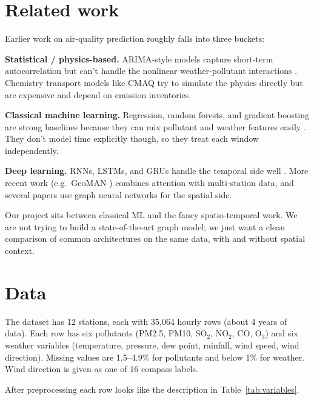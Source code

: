 \documentclass{article}
\begin{document}
\section{Related work}

Earlier work on air-quality prediction roughly falls into three
buckets:

\textbf{Statistical / physics-based.} ARIMA-style models capture short-term
autocorrelation but can't handle the nonlinear weather-pollutant
interactions \cite{Kumar2010arima}. Chemistry transport models like
CMAQ try to simulate the physics directly but are expensive and depend
on emission inventories.

\textbf{Classical machine learning.} Regression, random forests, and
gradient boosting are strong baselines because they can mix pollutant
and weather features easily \cite{Zheng2015kdd}. They don't model time
explicitly though, so they treat each window independently.

\textbf{Deep learning.} RNNs, LSTMs, and GRUs handle the temporal side
well \cite{Yi2018kdd}. More recent work (e.g.\ GeoMAN
\cite{Liang2018geoman}) combines attention with multi-station data,
and several papers use graph neural networks for the spatial side.

Our project sits between classical ML and the fancy spatio-temporal
work. We are not trying to build a state-of-the-art graph model; we
just want a clean comparison of common architectures on the same data,
with and without spatial context.

\section{Data}
\label{sec:data}

The dataset has 12 stations, each with 35{,}064 hourly rows (about 4
years of data). Each row has six pollutants (PM2.5, PM10, SO$_2$,
NO$_2$, CO, O$_3$) and six weather variables (temperature, pressure,
dew point, rainfall, wind speed, wind direction). Missing values are
1.5--4.9\% for pollutants and below 1\% for weather. Wind direction is
given as one of 16 compass labels.

After preprocessing each row looks like the description in
Table~\ref{tab:variables}.
\end{document}
